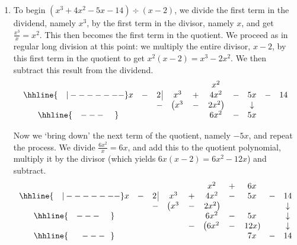 {
\begin{enumerate}

\item  To begin $\left(x^3 + 4x^2 - 5x - 14\right) \div (x-2)$, we divide the first term in the dividend, namely $x^3$, by the first term in the divisor, namely $x$, and get $\frac{x^3}{x} = x^2$. This then becomes the first term in the quotient.  We proceed as in regular long division at this point: we multiply the entire divisor, $x-2$, by this first term in the quotient to get $x^{2}(x - 2) = x^3 - 2x^2$.  We then subtract this result from the dividend.\setlength\arraycolsep{0.1pt}\setlength\extrarowheight{2pt}\[ \begin{array}{cccccccccc}

& & & & & x^2 & & &  &  \\ \hhline{~~~|-------}

x & - & 2 \, \vline& x^3 & + & 4x^2 & - & 5x & - & 14 \\

 &  &  -& \left(x^3 \right. & - & \left.  2x^2\right) &  & \downarrow &  &  \\ \hhline{~~~---~~~~} 
 &  &  &   &  & 6 x^2 & - & 5x &  &  \\ 
 
\end{array}\]

\setlength\arraycolsep{5pt}
\setlength\extrarowheight{0pt} 

Now we `bring down' the next term of the quotient, namely $-5x$, and repeat the process. We divide $\frac{6x^2}{x} = 6x$, and add this to the quotient polynomial, multiply it by the divisor (which yields $6x(x - 2) = 6x^{2} - 12x$) and subtract. \setlength\arraycolsep{0.1pt}\setlength\extrarowheight{2pt}\[ \begin{array}{cccccccccc}

& & & & & x^2 & + & 6x &  &  \\ \hhline{~~~|-------}

x & - & 2 \, \vline& x^3 & + & 4x^2 & - & 5x & - & 14 \\

 &  &  -& \left(x^3 \right. & - & \left.  2x^2\right) &  & &  & \downarrow  \\ \hhline{~~~---~~~~} 
 &  &  &   &  & 6 x^2 & - & 5x &  &  \downarrow \\ 
 &  &  &   & - & \left(6 x^2 \right. & - & \left. 12x \right) &  & \downarrow \\ \hhline{~~~~~---~~} 
 &  &  &   &   &  & & 7x  & - & 14 \\
 

\end{array}\]
\end{enumerate}}
